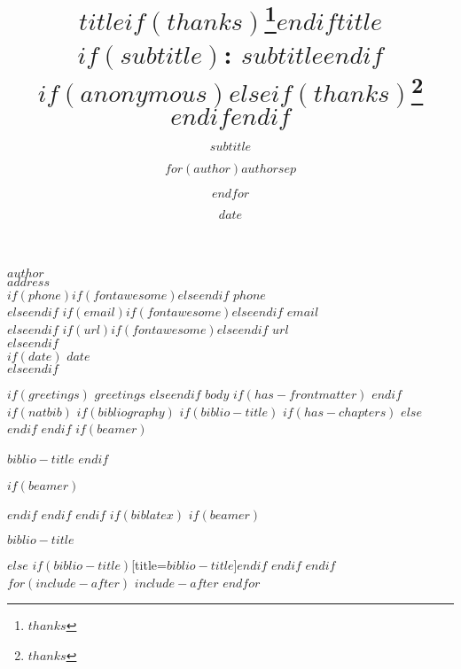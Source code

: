 \documentclass[
$if(fontsize)$
$fontsize$,
$endif$
$if(lang)$
$babel-lang$,
$endif$
$if(papersize)$
$papersize$paper,
$endif$
$if(beamer)$
ignorenonframetext,
$if(handout)$
handout,
$endif$
$if(aspectratio)$
aspectratio=$aspectratio$,
$endif$
$endif$
$for(classoption)$
$classoption$$sep$,
$endfor$
]{$documentclass$}
\title{$title$$if(thanks)$\thanks{$thanks$}$endif$}
\subtitle{$subtitle$}
\author{$for(author)$$author$$sep$ \and $endfor$}
\date{$date$}
\institute{$for(institute)$$institute$$sep$ \and $endfor$}
\title{$title$$if(subtitle)$: $subtitle$$endif$$if(anonymous)$$else$$if(thanks)$\thanks{$thanks$} $endif$$endif$ }
\date{}
\newif\ifbibliography
\DeclareRobustCommand{\href}[2]{#2\footnote{\url{#1}}}
\let\footnote=\endnote
\begin{document}
\thispagestyle{firstpage} %
\pagestyle{regular} %
\hfill
\begin{minipage}[t]{1\textwidth}
\raggedleft%
{\large \sffamily \bfseries $author$ }\\[.35ex]
\emph{\small $address$} \\[.35ex]
$if(phone)$$if(fontawesome)$\faPhone \hspace{1 mm}$else$$endif$ \small{$phone$} \\ $else$$endif$
$if(email)$$if(fontawesome)$\faEnvelopeO \hspace{1 mm}$else$$endif$ \small{\tt $email$} \\ $else$$endif$
$if(url)$$if(fontawesome)$\faGlobe \hspace{1 mm}$else$$endif$ \small{\href{http://$url$}{\tt $url$}}\\ $else$$endif$
\hspace{1cm} \\
$if(date)$ {\sffamily \bfseries $date$} \\ $else$$endif$
\end{minipage}
$if(greetings)$
\vspace*{1em}
$greetings$
\vspace*{1em}
$else$$endif$
%
$body$
$if(has-frontmatter)$
\backmatter
$endif$
$if(natbib)$
$if(bibliography)$
$if(biblio-title)$
$if(has-chapters)$
\renewcommand\bibname{$biblio-title$}
$else$
\renewcommand\refname{$biblio-title$}
$endif$
$endif$
$if(beamer)$
\begin{frame}[allowframebreaks]{$biblio-title$}
\bibliographytrue
$endif$

$if(beamer)$
\end{frame}
$endif$
$endif$
$endif$
$if(biblatex)$
$if(beamer)$
\begin{frame}[allowframebreaks]{$biblio-title$}
\bibliographytrue
\printbibliography[heading=none]
\end{frame}
$else$
\printbibliography$if(biblio-title)$[title=$biblio-title$]$endif$
$endif$
$endif$
$for(include-after)$
$include-after$
$endfor$
\end{document}
